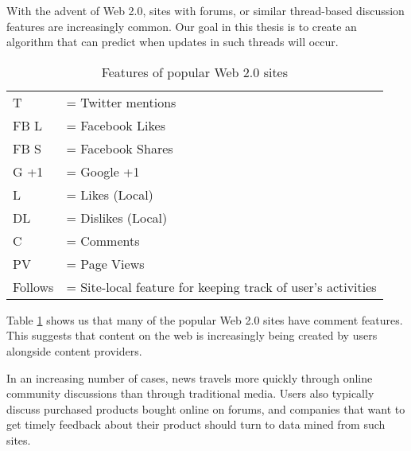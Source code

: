 With the advent of Web 2.0, sites with forums, or similar thread-based
discussion features are increasingly common.  
Our goal in this thesis
is to create an algorithm that can predict when updates in such
threads will occur.
\begin{table}
	{\footnotesize
\caption{Features of popular Web 2.0 sites}
\label{table:web20}
	\begin{tabular}{l l}
		T &= Twitter mentions\\
	 FB L &= Facebook Likes \\
		FB S &= Facebook Shares\\
	G +1 &= Google +1\\
		   L&= Likes (Local) \\
   		DL &= Dislikes (Local) \\
			C &= Comments \\
		PV &= Page Views \\
   Follows &= Site-local feature for keeping track of user's activities
	\end{tabular}
}
\end{table}

Table \ref{table:web20} shows us that many of the popular Web 2.0
sites have comment features. This suggests that content on the web is
increasingly being created by users alongside content providers.

In an increasing number of cases, news travels more quickly through
online community discussions than through traditional media. Users also
typically discuss purchased products bought online on forums,
and companies that want to get timely feedback about their product
should turn to data mined from such sites.

